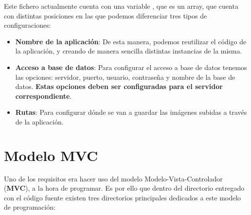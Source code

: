 \documentclass{\ClassPath/viu-tfm-template}
\begin{document}
Este fichero actualmente cuenta con una variable , que es un array, que cuenta con distintas posiciones en las que podemos diferenciar tres tipos de configuraciones:
\vspace{-1em}
\begin{itemize}
    \item \textbf{Nombre de la aplicación}: De esta manera, podemos reutilizar el código de la aplicación, y creando de manera sencilla distintas instancias de la misma.
    \item \textbf{Acceso a base de datos}: Para configurar el acceso a base de datos tenemos las opciones: servidor, puerto, usuario, contraseña y nombre de la base de datos. \textbf{Estas opciones deben ser configuradas para el servidor correspondiente}.
    \item \textbf{Rutas}: Para configurar dónde se van a guardar las imágenes subidas a través de la aplicación.
\end{itemize}
\vspace{-1em}

\section{Modelo MVC}
Uno de los requisitos era hacer uso del modelo Modelo-Vista-Controlador (\textbf{MVC}), a la hora de programar. Es por ello que dentro del directorio entregado con el código fuente existen tres directorios principales dedicados a este modelo de programación:
\end{document}
